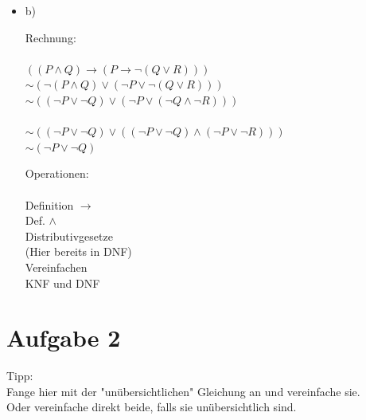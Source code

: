 \documentclass[a4paper]{scrartcl}
\begin{document}
\begin{itemize}
    \item b)\\
        \begin{minipage}[t]{0.55\textwidth}
            Rechnung:\\
            \\
            $((P \land Q) \rightarrow (P \rightarrow \neg (Q \lor R)))$\\
            $\sim (\neg (P \land Q) \lor (\neg P \lor \neg (Q \lor R)))$\\
            $\sim ((\neg P \lor \neg Q) \lor (\neg P \lor (\neg Q \land \neg R)))$\\
            \\
            $\sim ((\neg P \lor \neg Q) \lor ((\neg P \lor \neg Q) \land (\neg P \lor \neg R)))$\\
            $\sim (\neg P \lor \neg Q)$\\
        \end{minipage}
        \begin{minipage}[t]{0.4\textwidth}
            Operationen:\\
            \\
            Definition $\rightarrow$\\
            Def. $\land$\\
            Distributivgesetze\\
            (Hier bereits in DNF)\\
            Vereinfachen\\
            KNF und DNF
        \end{minipage}
\end{itemize}

\section*{Aufgabe 2}%
\label{sec:aufgabe_2}

Tipp:\\
Fange hier mit der "unübersichtlichen" Gleichung an und vereinfache sie.\\
Oder vereinfache direkt beide, falls sie unübersichtlich sind.
\end{document}
